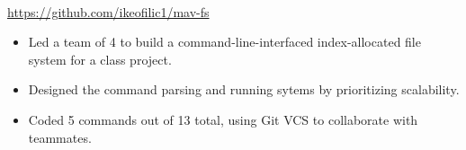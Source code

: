\\
{\url{https://github.com/ikeofilic1/mav-fs}}
\begin{itemize}
    \item Led a team of 4 to build a command-line-interfaced index-allocated file system for a class project.
    \item Designed the command parsing and running sytems by prioritizing scalability.
    \item Coded 5 commands out of 13 total, using Git VCS to collaborate with teammates.
\end{itemize}